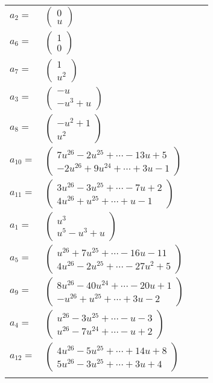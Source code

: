 \documentclass[1p]{elsarticle_modified}
\theoremstyle{definition}
\begin{document}
\begin{tabular}{m{7pt} m{180pt} m{7pt} m{180pt} }
\flushright $a_{2}=$&$\begin{pmatrix}0\\u\end{pmatrix}$ \\
\flushright $a_{6}=$&$\begin{pmatrix}1\\0\end{pmatrix}$ \\
\flushright $a_{7}=$&$\begin{pmatrix}1\\u^2\end{pmatrix}$ \\
\flushright $a_{3}=$&$\begin{pmatrix}- u\\- u^3+u\end{pmatrix}$ \\
\flushright $a_{8}=$&$\begin{pmatrix}- u^2+1\\u^2\end{pmatrix}$ \\
\flushright $a_{10}=$&$\begin{pmatrix}7 u^{26}-2 u^{25}+\cdots-13 u+5\\-2 u^{26}+9 u^{24}+\cdots+3 u-1\end{pmatrix}$ \\
\flushright $a_{11}=$&$\begin{pmatrix}3 u^{26}-3 u^{25}+\cdots-7 u+2\\4 u^{26}+u^{25}+\cdots+u-1\end{pmatrix}$ \\
\flushright $a_{1}=$&$\begin{pmatrix}u^3\\u^5- u^3+u\end{pmatrix}$ \\
\flushright $a_{5}=$&$\begin{pmatrix}u^{26}+7 u^{25}+\cdots-16 u-11\\4 u^{26}-2 u^{25}+\cdots-27 u^2+5\end{pmatrix}$ \\
\flushright $a_{9}=$&$\begin{pmatrix}8 u^{26}-40 u^{24}+\cdots-20 u+1\\- u^{26}+u^{25}+\cdots+3 u-2\end{pmatrix}$ \\
\flushright $a_{4}=$&$\begin{pmatrix}u^{26}-3 u^{25}+\cdots- u-3\\u^{26}-7 u^{24}+\cdots- u+2\end{pmatrix}$ \\
\flushright $a_{12}=$&$\begin{pmatrix}4 u^{26}-5 u^{25}+\cdots+14 u+8\\5 u^{26}-3 u^{25}+\cdots+3 u+4\end{pmatrix}$\\&\end{tabular}
\end{document}
